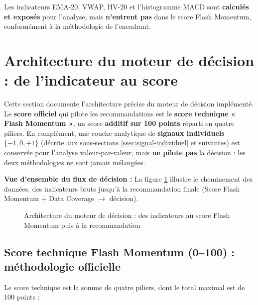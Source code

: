 \documentclass{rapportENSIAS} %
\begin{document}
\noindent
Les indicateurs EMA-20, VWAP, HV-20 et l'histogramme MACD sont \textbf{calculés et exposés} pour l'analyse, mais \textbf{n'entrent pas} dans le score Flash Momentum, conformément à la méthodologie de l'encadrant.

\section{Architecture du moteur de décision : de l'indicateur au score}
\label{sec:architecture-moteur}

\noindent
Cette section documente l'architecture précise du moteur de décision implémenté. Le \textbf{score officiel} qui pilote les recommandations est le \textbf{score technique « Flash Momentum »}, un score \textbf{additif sur 100 points} réparti en quatre piliers. En complément, une couche analytique de \textbf{signaux individuels $\{-1, 0, +1\}$} (décrite aux sous-sections \ref{ssec:signal-individuel} et suivantes) est conservée pour l'analyse valeur-par-valeur, mais \textbf{ne pilote pas} la décision : les deux méthodologies ne sont jamais mélangées.

\noindent
\textbf{Vue d'ensemble du flux de décision :} La figure \ref{fig:architecture-pipeline} illustre le cheminement des données, des indicateurs bruts jusqu'à la recommandation finale (Score Flash Momentum + Data Coverage $\rightarrow$ décision).

\begin{figure}[H]
\centering
\caption{Architecture du moteur de décision : des indicateurs au score Flash Momentum puis à la recommandation}
\label{fig:architecture-pipeline}
\end{figure}

\subsection{Score technique Flash Momentum (0--100) : méthodologie officielle}

\noindent
Le score technique est la somme de quatre piliers, dont le total maximal est de 100 points :
\end{document}
